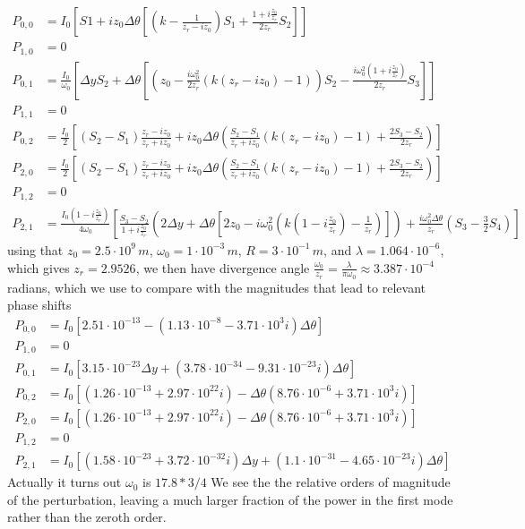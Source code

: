 \documentclass[11pt]{amsart}
\makeatletter
\newcommand{\0}{\varnothing}		%
\newcommand{\apr}{\approx}		%
\newcommand{\ti}{\cdot}			%
\newcommand{\1}{!}
\newcommand{\2}{@}
\newcommand{\3}{\#}
\newcommand{\4}{\$}
\newcommand{\5}{\%}
\newcommand{\6}{$^\wedge$}
\newcommand{\7}{\&}
\newcommand{\8}{*}
\newcommand{\9}{(}
\makeatother
\begin{document}
\begin{align*}
P_{0,0} &=I_0\left[S1+iz_0\Delta \theta\left[\left(k-\frac{1}{z_r-iz_0}\right)S_1 + \frac{1+i\frac{z_0}{z_r}}{2z_r}S_2\right]\right]
\\
P_{1,0} &= 0
\\
P_{0,1} &= \frac{I_0}{\omega_0}\left[\Delta y S_2 + \Delta \theta\left[\left(z_0-\frac{i\omega_0^2}{2z_r}\left(k\left(z_r-iz_0\right)-1\right)\right)S_2 - \frac{i\omega_0^2\left(1+i\frac{z_0}{z_r}\right)}{2z_r}S_3\right]\right]
\\
P_{1,1} &=0
\\
P_{0,2} &= \frac{I_0}{2}\left[\left(S_2-S_1\right)\frac{z_r-iz_0}{z_r+iz_0}+iz_0\Delta\theta\left(\frac{S_2-S_1}{z_r+iz_0}\left(k\left(z_r-iz_0\right)-1\right)+\frac{2S_3-S_2}{2z_r}\right)\right]
\\
P_{2,0} &= \frac{I_0}{2}\left[\left(S_2-S_1\right)\frac{z_r-iz_0}{z_r+iz_0}+iz_0\Delta\theta\left(\frac{S_2-S_1}{z_r+iz_0}\left(k\left(z_r-iz_0\right)-1\right)+\frac{2S_3-S_2}{2z_r}\right)\right]
\\
P_{1,2} &= 0
\\
P_{2,1} &= \frac{I_0\left(1-i\frac{z_0}{z_r}\right)}{4\omega_0}\left[\frac{S_3-S_2}{1+i\frac{z_0}{z_r}}\left(2\Delta y + \Delta \theta\left[2z_0-i\omega_0^2\left(k\left(1-i\frac{z_0}{z_r}\right)-\frac{1}{z_r}\right)\right]\right)+\frac{i\omega_0^2\Delta \theta}{z_r}\left(S_3-\frac{3}{2}S_4\right)\right]
\end{align*}
using that $z_0 = 2.5\ti 10^9\,m$, $\omega_0 = 1\ti 10^{-3}\, m$,  $R = 3\ti 10^{-1}\,m$, and $\lambda = 1.064\ti 10^{-6}$, which gives $z_r = 2.9526$, we then have divergence angle $\frac{\omega_0}{z_r} =\frac{\lambda}{\pi \omega_0}\apr 3.387\ti 10^{-4}$ radians, which we use to compare with the magnitudes that lead to relevant phase shifts
\begin{align*}
P_{0,0} &= I_0 \left[2.51\ti10^{-13} -\left(1.13\ti 10^{-8}-3.71\ti10^{3}i\right)\Delta \theta\right]
\\
P_{1,0} &= 0
\\
P_{0,1} &= I_0\left[3.15\ti 10^{-23}\Delta y +\left(3.78\ti 10^{-34} - 9.31\ti 10^{-23} i\right)\Delta \theta\right]
\\
P_{0,2} &= I_0\left[\left(1.26\ti 10^{-13}+2.97\ti 10^{22}i\right)-\Delta \theta\left(8.76\ti 10^{-6}+3.71\ti10^3 i\right)\right]
\\
P_{2,0} &= I_0\left[\left(1.26\ti 10^{-13}+2.97\ti 10^{22}i\right)-\Delta \theta\left(8.76\ti 10^{-6}+3.71\ti10^3 i\right)\right]
\\
P_{1,2} &=0
\\
P_{2,1} &=I_0\left[\left(1.58\ti 10^{-23}+3.72\ti 10^{-32}i\right)\Delta y + \left(1.1\ti 10^{-31}-4.65\ti10^{-23}i\right)\Delta \theta\right]
\end{align*}
Actually it turns out $\omega_0$ is $17.8*3/4$
We see the the relative orders of magnitude of the perturbation, leaving a much larger fraction of the power in the first mode rather than the zeroth order.
\newpage
\end{document}
